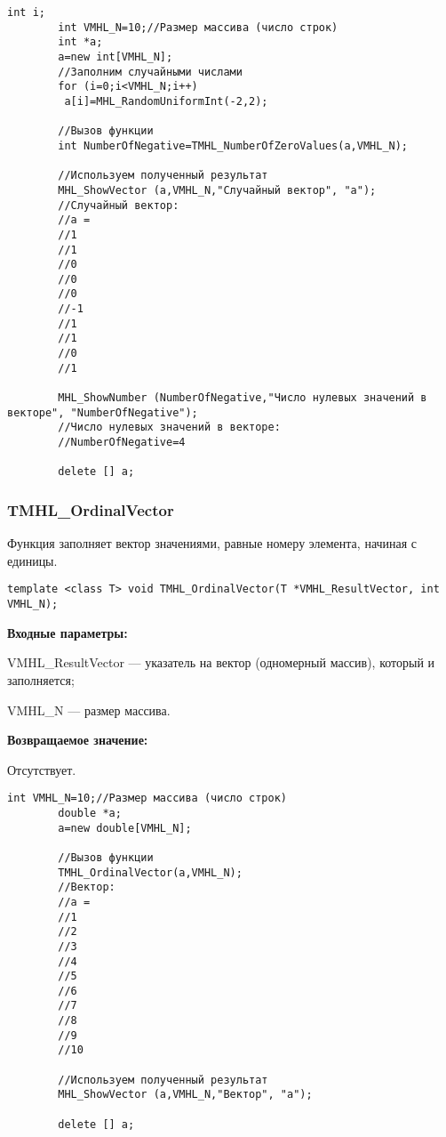 \documentclass[a4paper,12pt]{article}
\begin{document}
\begin{lstlisting}[label=code_use_TMHL_NumberOfZeroValues,caption=Пример использования]
        int i;
        int VMHL_N=10;//Размер массива (число строк)
        int *a;
        a=new int[VMHL_N];
        //Заполним случайными числами
        for (i=0;i<VMHL_N;i++)
         a[i]=MHL_RandomUniformInt(-2,2);

        //Вызов функции
        int NumberOfNegative=TMHL_NumberOfZeroValues(a,VMHL_N);

        //Используем полученный результат
        MHL_ShowVector (a,VMHL_N,"Случайный вектор", "a");
        //Случайный вектор:
        //a =	
        //1
        //1
        //0
        //0
        //0
        //-1
        //1
        //1
        //0
        //1
        
        MHL_ShowNumber (NumberOfNegative,"Число нулевых значений в векторе", "NumberOfNegative");
        //Число нулевых значений в векторе:
        //NumberOfNegative=4

        delete [] a;
\end{lstlisting}

\subsubsection{TMHL\_OrdinalVector}\label{TMHL_OrdinalVector}

Функция заполняет вектор значениями, равные номеру элемента, начиная с единицы.


\begin{lstlisting}[label=code_syntax_TMHL_OrdinalVector,caption=Синтаксис]
template <class T> void TMHL_OrdinalVector(T *VMHL_ResultVector, int VMHL_N);
\end{lstlisting}

\textbf{Входные параметры:}

 VMHL\_ResultVector --- указатель на вектор (одномерный массив), который и заполняется;
 
 VMHL\_N --- размер массива.

\textbf{Возвращаемое значение:}

Отсутствует.


\begin{lstlisting}[label=code_use_TMHL_OrdinalVector,caption=Пример использования]
        int VMHL_N=10;//Размер массива (число строк)
        double *a;
        a=new double[VMHL_N];

        //Вызов функции
        TMHL_OrdinalVector(a,VMHL_N);
        //Вектор:
        //a =	
        //1
        //2
        //3
        //4
        //5
        //6
        //7
        //8
        //9
        //10

        //Используем полученный результат
        MHL_ShowVector (a,VMHL_N,"Вектор", "a");

        delete [] a;
\end{lstlisting}
\end{document}
